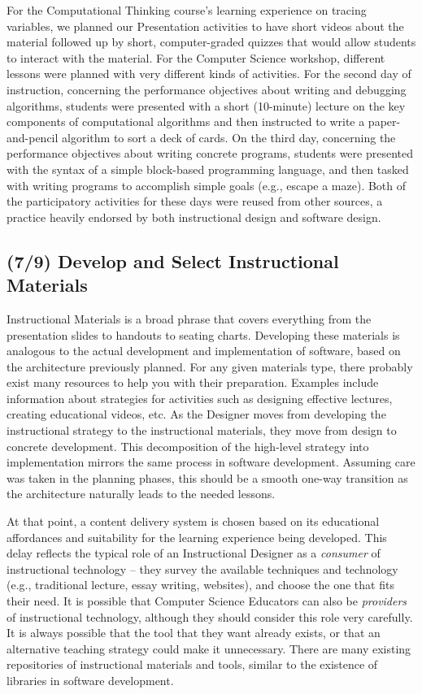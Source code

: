 For the Computational Thinking course's learning experience on tracing variables, we planned our Presentation activities to have short videos about the material followed up by short, computer-graded quizzes that would allow students to interact with the material.
For the Computer Science workshop, different lessons were planned with very different kinds of activities.
For the second day of instruction, concerning the performance objectives about writing and debugging algorithms, students were presented with a short (10-minute) lecture on the key components of computational algorithms and then instructed to write a paper-and-pencil algorithm to sort a deck of cards.
On the third day, concerning the performance objectives about writing concrete programs, students were presented with the syntax of a simple block-based programming language, and then tasked with writing programs to accomplish simple goals (e.g., escape a maze).
Both of the participatory activities for these days were reused from other sources, a practice heavily endorsed by both instructional design and software design.


\subsection{(7/9) Develop and Select Instructional Materials}

Instructional Materials is a broad phrase that covers everything from the presentation slides to handouts to seating charts.
Developing these materials is analogous to the actual development and implementation of software, based on the architecture previously planned.
For any given materials type, there probably exist many resources to help you with their preparation.
Examples include information about strategies for activities such as designing effective lectures, creating educational videos, etc.
As the Designer moves from developing the instructional strategy to the instructional materials, they move from design to concrete development.
This decomposition of the high-level strategy into implementation mirrors the same process in software development.
Assuming care was taken in the planning phases, this should be a smooth one-way transition as the architecture naturally leads to the needed lessons.

At that point, a content delivery system is chosen based on its educational affordances and suitability for the learning experience being developed.
This delay reflects the typical role of an Instructional Designer as a \textit{consumer} of instructional technology -- they survey the available techniques and technology (e.g., traditional lecture, essay writing, websites), and choose the one that fits their need.
It is possible that Computer Science Educators can also be \textit{providers} of instructional technology, although they should consider this role very carefully.
It is always possible that the tool that they want already exists, or that an alternative teaching strategy could make it unnecessary.
There are many existing repositories of instructional materials and tools, similar to the existence of libraries in software development.

